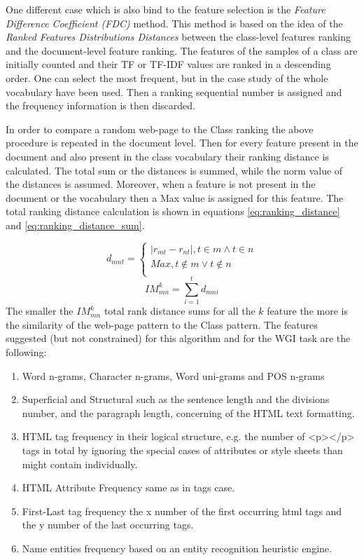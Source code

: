 One different case which is also bind to the feature selection is the \textit{Feature Difference Coefficient (FDC)} method. This method is based on the idea of the \textit{Ranked Features Distributions Distances} between the class-level features ranking and the document-level feature ranking. The features of the samples of a class are initially counted and their TF or TF-IDF values are ranked in a descending order. One can select the most frequent, but in the case study of \parencite{waltinger2010feature} the whole vocabulary have been used. Then a ranking sequential number is assigned and the frequency information is then discarded.

In order to compare a random web-page to the Class ranking the above procedure is repeated in the document level. Then for every feature present in the document and also present in the class vocabulary their ranking distance is calculated. The total sum or the distances is summed, while the norm value of the distances is assumed. Moreover, when a feature is not present in the document or the vocabulary then a Max value is assigned for this feature. The total ranking distance calculation is shown in equations \ref{eq:ranking_distance} and \ref{eq:ranking_distance_sum}.

\begin{equation}\label{eq:ranking_distance}
	d_{mnt} =
      \begin{cases}
      	| r_{mt} - r_{nt} |, t \in m \wedge t \in n  \\
        Max, t \notin m \vee t \notin n \\ 
       \end{cases}
\end{equation}
\begin{equation}\label{eq:ranking_distance_sum}
	IM_{mn}^{k} = \sum_{i=1}^{t} d_{mni}
\end{equation}
The smaller the $IM^{k}_{mn}$ total rank distance sums for all the $k$ feature the more is the similarity of the web-page pattern to the Class pattern. The features suggested (but not constrained) for this algorithm and for the WGI task are the following:

\begin{enumerate}
\item Word n-grams, Character n-grams, Word uni-grams and POS n-grams
\item Superficial and Structural such as the sentence length and the divisions number, and the paragraph length, concerning of the HTML text formatting.
\item HTML tag frequency in their logical structure, e.g. the number of <p></p> tags in total by ignoring the special cases of attributes or style sheets than might contain individually.
\item HTML Attribute Frequency same as in tags case.
\item First-Last tag frequency the x number of  the first occurring html tags and the y number of the last occurring tags.
\item Name entities frequency based on an entity recognition heuristic engine.
\end{enumerate}

